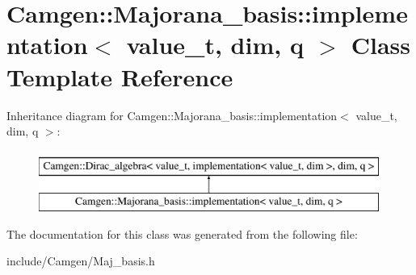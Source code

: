 \hypertarget{a00295}{}\section{Camgen\+:\+:Majorana\+\_\+basis\+:\+:implementation$<$ value\+\_\+t, dim, q $>$ Class Template Reference}
\label{a00295}
Inheritance diagram for Camgen\+:\+:Majorana\+\_\+basis\+:\+:implementation$<$ value\+\_\+t, dim, q $>$\+:\begin{figure}[H]
\begin{center}
\leavevmode
\includegraphics[height=2.000000cm]{a00295}
\end{center}
\end{figure}


The documentation for this class was generated from the following file\+:\begin{DoxyCompactItemize}
\item 
include/\+Camgen/Maj\+\_\+basis.\+h\end{DoxyCompactItemize}
